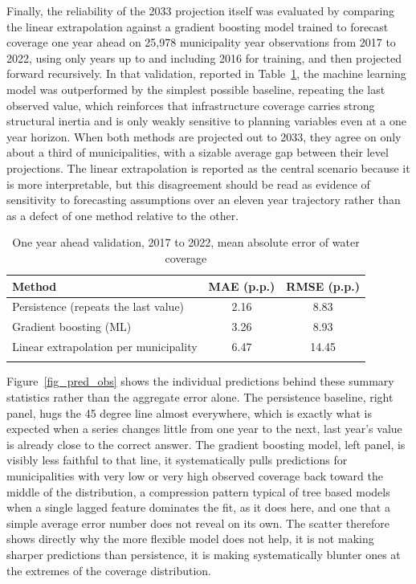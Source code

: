 \documentclass[pdflatex,sn-mathphys-num]{sn-jnl}%
\theoremstyle{thmstyleone}%
\theoremstyle{thmstyletwo}%
\theoremstyle{thmstylethree}%
\begin{document}
Finally, the reliability of the 2033 projection itself was evaluated by comparing the linear extrapolation against a gradient boosting model trained to forecast coverage one year ahead on 25,978 municipality year observations from 2017 to 2022, using only years up to and including 2016 for training, and then projected forward recursively. In that validation, reported in Table~\ref{tab_validacao_ml}, the machine learning model was outperformed by the simplest possible baseline, repeating the last observed value, which reinforces that infrastructure coverage carries strong structural inertia and is only weakly sensitive to planning variables even at a one year horizon. When both methods are projected out to 2033, they agree on only about a third of municipalities, with a sizable average gap between their level projections. The linear extrapolation is reported as the central scenario because it is more interpretable, but this disagreement should be read as evidence of sensitivity to forecasting assumptions over an eleven year trajectory rather than as a defect of one method relative to the other.

\begin{table}[h]
\caption{One year ahead validation, 2017 to 2022, mean absolute error of water coverage}\label{tab_validacao_ml}
\begin{tabular}{@{}lcc@{}}
\toprule
Method & MAE (p.p.) & RMSE (p.p.) \\
\midrule
Persistence (repeats the last value) & 2.16 & 8.83 \\
Gradient boosting (ML)               & 3.26 & 8.93 \\
Linear extrapolation per municipality & 6.47 & 14.45 \\
\botrule
\end{tabular}
\end{table}

Figure~\ref{fig_pred_obs} shows the individual predictions behind these summary statistics rather than the aggregate error alone. The persistence baseline, right panel, hugs the 45 degree line almost everywhere, which is exactly what is expected when a series changes little from one year to the next, last year's value is already close to the correct answer. The gradient boosting model, left panel, is visibly less faithful to that line, it systematically pulls predictions for municipalities with very low or very high observed coverage back toward the middle of the distribution, a compression pattern typical of tree based models when a single lagged feature dominates the fit, as it does here, and one that a simple average error number does not reveal on its own. The scatter therefore shows directly why the more flexible model does not help, it is not making sharper predictions than persistence, it is making systematically blunter ones at the extremes of the coverage distribution.
\end{document}
